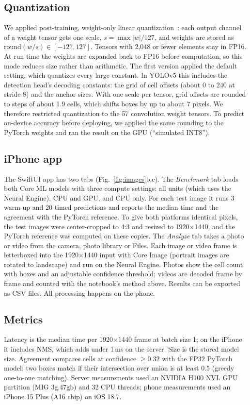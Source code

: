 \documentclass[conference]{IEEEtran}
\begin{document}
\subsection{Quantization}
We applied post-training, weight-only linear quantization~\cite{jacob2018,nagel2021}: each output channel of a weight tensor gets one scale, $s = \max|w|/127$, and weights are stored as $\mathrm{round}(w/s) \in [-127, 127]$. Tensors with 2,048 or fewer elements stay in FP16. At run time the weights are expanded back to FP16 before computation, so this mode reduces size rather than arithmetic. The first version applied the default setting, which quantizes every large constant. In YOLOv5 this includes the detection head's decoding constants: the grid of cell offsets (about 0 to 240 at stride 8) and the anchor sizes. With one scale per tensor, grid offsets are rounded to steps of about 1.9 cells, which shifts boxes by up to about 7 pixels. We therefore restricted quantization to the 57 convolution weight tensors. To predict on-device accuracy before deploying, we applied the same rounding to the PyTorch weights and ran the result on the GPU (``simulated INT8'').

\subsection{iPhone app}
The SwiftUI app has two tabs (Fig.~\ref{fig:images}b,c). The \emph{Benchmark} tab loads both Core ML models with three compute settings: all units (which uses the Neural Engine), CPU and GPU, and CPU only. For each test image it runs 3 warm-up and 20 timed predictions and reports the median time and the agreement with the PyTorch reference. To give both platforms identical pixels, the test images were center-cropped to 4:3 and resized to 1920$\times$1440, and the PyTorch reference was computed on these copies. The \emph{Analyze} tab takes a photo or video from the camera, photo library or Files. Each image or video frame is letterboxed into the 1920$\times$1440 input with Core Image (portrait images are rotated to landscape) and run on the Neural Engine. Photos show the cell count with boxes and an adjustable confidence threshold; videos are decoded frame by frame and counted with the notebook's method above. Results can be exported as CSV files. All processing happens on the phone.

\subsection{Metrics}
Latency is the median time per 1920$\times$1440 frame at batch size 1; on the iPhone it includes NMS, which adds under 1\,ms on the server. Size is the stored model size. Agreement compares cells at confidence $\geq 0.32$ with the FP32 PyTorch model: two boxes match if their intersection over union is at least 0.5 (greedy one-to-one matching). Server measurements used an NVIDIA H100 NVL GPU partition (MIG 3g.47gb) and 32 CPU threads; phone measurements used an iPhone 15 Plus (A16 chip) on iOS 18.7.
\end{document}
